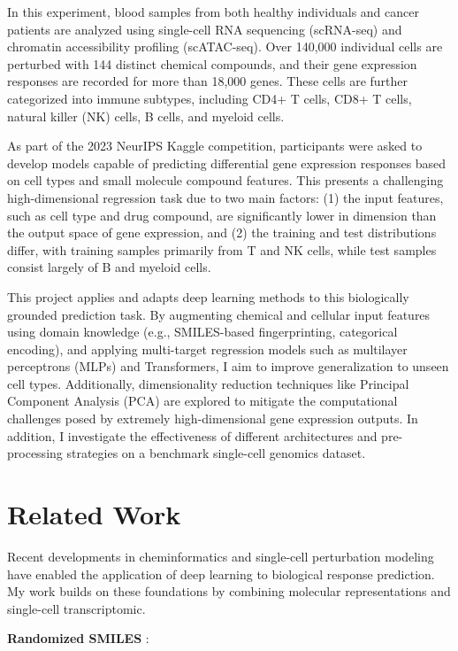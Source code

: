 \documentclass[11pt, oneside]{article}   	%
\begin{document}
In this experiment, blood samples from both healthy individuals and cancer patients are analyzed using single-cell RNA sequencing (scRNA-seq) and chromatin accessibility profiling (scATAC-seq). Over 140,000 individual cells are perturbed with 144 distinct chemical compounds, and their gene expression responses are recorded for more than 18,000 genes. These cells are further categorized into immune subtypes, including CD4+ T cells, CD8+ T cells, natural killer (NK) cells, B cells, and myeloid cells.

As part of the 2023 NeurIPS Kaggle competition, participants were asked to develop models capable of predicting differential gene expression responses based on cell types and small molecule compound features. This presents a challenging high-dimensional regression task due to two main factors: (1) the input features, such as cell type and drug compound, are significantly lower in dimension than the output space of gene expression, and (2) the training and test distributions differ, with training samples primarily from T and NK cells, while test samples consist largely of B and myeloid cells.

This project applies and adapts deep learning methods to this biologically grounded prediction task. By augmenting chemical and cellular input features using domain knowledge (e.g., SMILES-based fingerprinting, categorical encoding), and applying multi-target regression models such as multilayer perceptrons (MLPs) and Transformers, I aim to improve generalization to unseen cell types. Additionally, dimensionality reduction techniques like Principal Component Analysis (PCA) are explored to mitigate the computational challenges posed by extremely high-dimensional gene expression outputs. In addition, I investigate the effectiveness of different architectures and pre-processing strategies on a benchmark single-cell genomics dataset.



\section*{Related Work}

Recent developments in cheminformatics and single-cell perturbation modeling have enabled the application of deep learning to biological response prediction. My work builds on these foundations by combining molecular representations and single-cell transcriptomic.


\textbf{Randomized SMILES} \cite{RandomSmiles}: 
\end{document}

